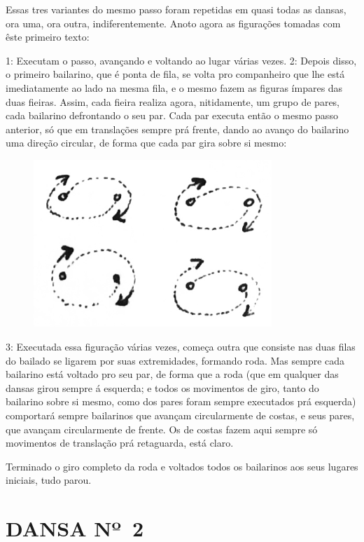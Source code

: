 Essas tres variantes do mesmo passo foram repetidas em quasi todas as
dansas, ora uma, ora outra, indiferentemente. Anoto agora as figurações
tomadas com êste primeiro texto:

1: Executam o passo, avançando e voltando ao lugar várias vezes. 2:
Depois disso, o primeiro bailarino, que é ponta de fila, se volta pro
companheiro que lhe está imediatamente ao lado na mesma fila, e o mesmo
fazem as figuras ímpares das duas fieiras. Assim, cada fieira realiza
agora, nitidamente, um grupo de pares, cada bailarino defrontando o seu
par. Cada par executa então o mesmo passo anterior, só que em
translações sempre prá frente, dando ao avanço do bailarino uma direção
circular, de forma que cada par gira sobre si mesmo:

\begin{figure}[!ht]
\centering
 \includegraphics[width=90mm]{./imgs/img5.jpg}
\end{figure}

3: Executada essa figuração várias vezes, começa outra que consiste nas
duas filas do bailado se ligarem por suas extremidades, formando roda.
Mas sempre cada bailarino está voltado pro seu par, de forma que a roda
(que em qualquer das dansas girou sempre á esquerda; e todos os
movimentos de giro, tanto do bailarino sobre si mesmo, como dos pares
foram sempre executados prá esquerda) comportará sempre bailarinos que
avançam circularmente de costas, e seus pares, que avançam circularmente
de frente. Os de costas fazem aqui sempre só movimentos de translação
prá retaguarda, está claro.

Terminado o giro completo da roda e voltados todos os bailarinos aos
seus lugares iniciais, tudo parou.

\pagebreak

\section{DANSA Nº~2}

